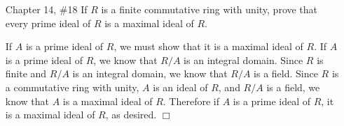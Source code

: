\documentclass{article}
\begin{document}
\begin{enumerate}
    \item[Chapter 14, \#18] If $R$ is a finite commutative ring with unity, prove that every prime ideal of $R$ is a maximal ideal of $R$.
    
    \begin{flushleft}
    If $A$ is a prime ideal of $R$, we must show that it is a maximal ideal of $R$. If $A$ is a prime ideal of $R$, we know that $R/A$ is an integral domain. Since $R$ is finite and $R/A$ is an integral domain, we know that $R/A$ is a field. Since $R$ is a commutative ring with unity, $A$ is an ideal of $R$, and $R/A$ is a field, we know that $A$ is a maximal ideal of $R$. Therefore if $A$ is a prime ideal of $R$, it is a maximal ideal of $R$, as desired. $\Box$
    \end{flushleft}

\end{enumerate}
\end{document}
